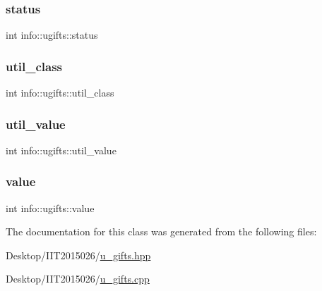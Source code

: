 \subsubsection{\texorpdfstring{status}{status}}
{\footnotesize\ttfamily int info\+::ugifts\+::status\hspace{0.3cm}{\ttfamily [private]}}

\mbox{\label{classinfo_1_1ugifts_aecd6e74f6918f05159553cbc681b9755}} 
\subsubsection{\texorpdfstring{util\+\_\+class}{util\_class}}
{\footnotesize\ttfamily int info\+::ugifts\+::util\+\_\+class\hspace{0.3cm}{\ttfamily [private]}}

\mbox{\label{classinfo_1_1ugifts_ace26fb8f859ca33f4f0640f9ae3e334e}} 
\subsubsection{\texorpdfstring{util\+\_\+value}{util\_value}}
{\footnotesize\ttfamily int info\+::ugifts\+::util\+\_\+value\hspace{0.3cm}{\ttfamily [private]}}

\mbox{\label{classinfo_1_1ugifts_acb5eadf80c47a571fea87099f62c427b}} 
\subsubsection{\texorpdfstring{value}{value}}
{\footnotesize\ttfamily int info\+::ugifts\+::value\hspace{0.3cm}{\ttfamily [private]}}



The documentation for this class was generated from the following files\+:\begin{DoxyCompactItemize}
\item 
Desktop/\+I\+I\+T2015026/\hyperlink{u__gifts_8hpp}{u\+\_\+gifts.\+hpp}\item 
Desktop/\+I\+I\+T2015026/\hyperlink{u__gifts_8cpp}{u\+\_\+gifts.\+cpp}\end{DoxyCompactItemize}

